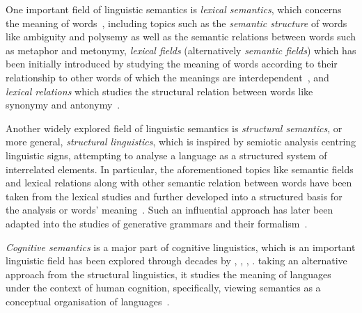 One important field of linguistic semantics is \emph{lexical semantics}, which concerns the meaning of words~\citep{palmer1981semantics, PUSTEJOVSKY200698, LexicalSemantics}, including topics such as the \emph{semantic structure} of words like ambiguity and polysemy as well as the semantic relations between words such as metaphor and metonymy, \emph{lexical fields} (alternatively \emph{semantic fields}) which has been initially introduced by \citet{trier1931deutsche} studying the meaning of words according to their relationship to other words of which the meanings are interdependent~\citep{palmer1981semantics, jackson2000words}, and \emph{lexical relations} which studies the structural relation between words like synonymy and antonymy~\citep{LexicalSemantics}.

Another widely explored field of linguistic semantics is \emph{structural semantics}, or more general, \emph{structural linguistics}, which is inspired by  semiotic analysis centring linguistic signs, attempting to analyse a language as a structured system of interrelated elements. In particular, the aforementioned topics like semantic fields and lexical relations along with other semantic relation between words have been taken from the lexical studies and further developed into a structured basis for the analysis or words' meaning~\citep{LexicalSemantics}. Such an influential approach has later been adapted into the studies of generative grammars and their formalism~\citep{Katz1963-KATTSO-3, Chomsky1975-CHOTLS}.

\emph{Cognitive semantics} is a major part of cognitive linguistics, which is an important linguistic field has been explored through decades by \citet{Johnson1987-JOHTBI}, \citet{alma9923109163502466}, \citet{alma993245163502466}, \citet{fauconnier1998}. taking an alternative approach from the structural linguistics, it studies the meaning of languages under the context of human cognition, specifically, viewing semantics as a conceptual organisation of languages~\citep{10.7551/mitpress/6847.001.0001, Croft_Cruse_2004}.

